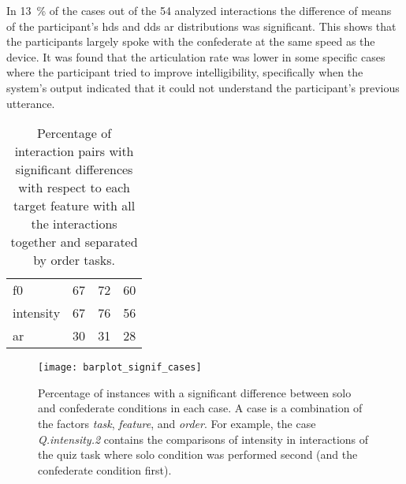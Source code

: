 In \SI{13}{\percent} of the cases out of the 54 analyzed interactions the difference of means of the participant's \ac{hds} and \ac{dds} \ac{ar} distributions was significant.
This shows that the participants largely spoke with the confederate at the same speed as the device.
It was found that the articulation rate was lower in some specific cases where the participant tried to improve intelligibility, specifically when the system's output indicated that it could not understand the participant's previous utterance.
%
\begin{table}[t]
	\centering
	\caption[Percentage of significantly different interaction pairs in addressee component]
	{Percentage of interaction pairs with significant differences with respect to each target feature with all the interactions together and separated by order tasks.}
	\label{tab:signif_conditions}
	\begin{tabularx}{\linewidth}{XSSS}
		\toprule
		 & {} & {}	& {}\\
		\midrule
		\acs{f0}	& 67	& 72	& 60 \\
		intensity 	& 67	& 76	& 56 \\
		\acs{ar}	& 30	& 31	& 28 \\
		\bottomrule	
	\end{tabularx}
\end{table}
%
\begin{figure}[t]
	\centering
	\texttt{[image: barplot\_signif\_cases]}
	\caption[Per-case comparison of significant distributional differences in the crowd component]
		{Percentage of instances with a significant difference between solo and confederate conditions in each case.
		A case is a combination of the factors \emph{task}, \emph{feature}, and \emph{order}.
		For example, the case \emph{Q.intensity.2} contains the comparisons of intensity in interactions of the quiz task where solo condition was performed second (and the confederate condition first).}
	\label{fig:signif_cases_ordered}
\end{figure}
%

